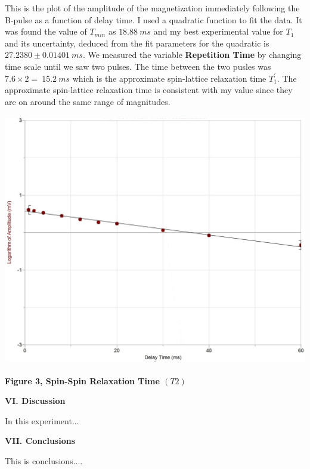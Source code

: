 \documentclass[fleqn]{article}
\begin{document}
  \vspace{10px}

  This is the plot of the amplitude of the magnetization immediately following the B-pulse as a function of delay time. 
  I used a quadratic function to fit the data. It was found the value of $T_{min}$ as $18.88 ~ ms$ and my best 
  experimental value for $T_1$ and its uncertainty, deduced from the fit parameters for the quadratic is
  $27.2380 \pm 0.01401 ~ ms$. 
  We measured the variable \textbf{Repetition Time} by changing time scale until we saw two pulses. The time between the 
  two pusles was $7.6 \times 2= ~ 15.2 ~ ms$ which is the approximate spin-lattice relaxation time $T_1^'$. The 
  approximate spin-lattice relaxation time is consistent with my value since they are on around the same range of magnitudes.

  \pagebreak

  \includegraphics[height=11cm, width=15cm]{Fig3.JPG}

  \textbf{Figure 3, Spin-Spin Relaxation Time $(T2)$}

  \pagebreak


  \textbf{VI. Discussion}

  \vspace{10px}

  In this experiment...
  
  \vspace{20px}


  \textbf{VII. Conclusions}

  \vspace{10px}

  This is conclusions....
  
  \vspace{20px}


  \printbibliography
\end{document}
